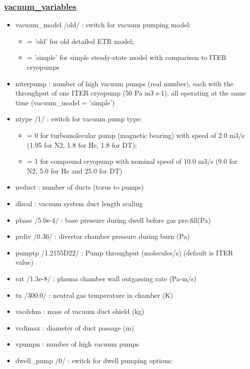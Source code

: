 \documentclass[]{article}
\providecommand{\tightlist}{%
  \setlength{\itemsep}{0pt}\setlength{\parskip}{0pt}}
\begin{document}
\hypertarget{vacuum_variables}{%
\subsubsection{\texorpdfstring{\href{vacuum_variables.html}{vacuum\_variables}}{vacuum\_variables}}\label{vacuum_variables}}

\begin{itemize}
\item
  vacuum\_model /old/ : switch for vacuum pumping model:

  \begin{itemize}
  \tightlist
  \item
    = 'old' for old detailed ETR model;
  \item
    = 'simple' for simple steady-state model with comparison to ITER
    cryopumps
  \end{itemize}
\item
  niterpump : number of high vacuum pumps (real number), each with the
  throughput of one ITER cryopump (50 Pa m3 s-1), all operating at the
  same time (vacuum\_model = 'simple')
\item
  ntype /1/ : switch for vacuum pump type:

  \begin{itemize}
  \tightlist
  \item
    = 0 for turbomolecular pump (magnetic bearing) with speed of 2.0
    m3/s (1.95 for N2, 1.8 for He, 1.8 for DT);
  \item
    = 1 for compound cryopump with nominal speed of 10.0 m3/s (9.0 for
    N2, 5.0 for He and 25.0 for DT)
  \end{itemize}
\item
  nvduct : number of ducts (torus to pumps)
\item
  dlscal : vacuum system duct length scaling
\item
  pbase /5.0e-4/ : base pressure during dwell before gas pre-fill(Pa)
\item
  prdiv /0.36/ : divertor chamber pressure during burn (Pa)
\item
  pumptp /1.2155D22/ : Pump throughput (molecules/s) (default is ITER
  value)
\item
  rat /1.3e-8/ : plasma chamber wall outgassing rate (Pa-m/s)
\item
  tn /300.0/ : neutral gas temperature in chamber (K)
\item
  vacdshm : mass of vacuum duct shield (kg)
\item
  vcdimax : diameter of duct passage (m)
\item
  vpumpn : number of high vacuum pumps
\item
  dwell\_pump /0/ : switch for dwell pumping options:


\end{itemize}
\end{document}
